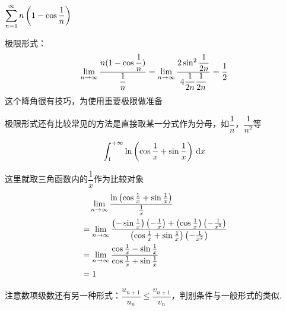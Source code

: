 \begin{example}
$\displaystyle\sum_{n=1}^{\infty}n\left(1-\cos\frac{1}{n}\right)$
\end{example}
\begin{analysis}
极限形式：
\[\displaystyle\lim_{n\to\infty}\dfrac{n(1-\cos\dfrac{1}{n})}{\dfrac{1}{n}}=\displaystyle\lim_{n\to\infty}\dfrac{2\sin^2\dfrac{1}{2n}}{4\dfrac{1}{2n}\dfrac{1}{2n}}=\dfrac{1}{2}\]
这个降角很有技巧，为使用重要极限做准备
\end{analysis}
极限形式还有比较常见的方法是直接取某一分式作为分母，如$\dfrac{1}{n}$，$\dfrac{1}{n^2}$等
\begin{example}
\[\displaystyle\int_{1}^{+\infty}{\ln\left(\cos\dfrac{1}{x}+\sin\dfrac{1}{x}\right)}\,\,\mathrm{d} x\]
\end{example}
\begin{analysis}
这里就取三角函数内的$\dfrac{1}{x}$作为比较对象
\[\begin{aligned}
&\quad\displaystyle\lim_{n\to\infty}\dfrac{\ln\left(\cos\frac{1}{x}+\sin\frac{1}{x}\right)}{\frac{1}{x}}\\
&=\displaystyle\lim_{n\to\infty}\dfrac{\left(-\sin\frac{1}{x}\right)\left(-\frac{1}{x}\right)+\left(\cos\frac{1}{x}\right)\left(-\frac{1}{x^2}\right)}{\left(\cos\frac{1}{x}+\sin\frac{1}{x}\right)\left(-\frac{1}{x^2}\right)}\\
&=\displaystyle\lim_{n\to\infty}\dfrac{\cos\frac{1}{x}-\sin\frac{1}{x}}{\cos\frac{1}{x}+\sin\frac{1}{x}}\\
&=1
\end{aligned}\]
\end{analysis}
\par 注意数项级数还有另一种形式：$\dfrac{u_{n+1}}{u_n}\leq\dfrac{v_{n+1}}{v_n}$，判别条件与一般形式的类似.

